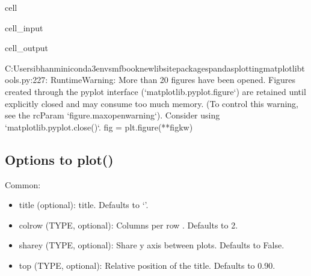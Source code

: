 \documentclass[letterpaper,10pt,english]{jupyterBook}
\begin{document}
\begin{sphinxuseclass}{cell}\begin{sphinxVerbatimInput}

\begin{sphinxuseclass}{cell_input}
\begin{sphinxVerbatim}[commandchars=\\\{\}]

\PYG{p}{[}\PYG{p}{]}
\end{sphinxVerbatim}

\end{sphinxuseclass}\end{sphinxVerbatimInput}
\begin{sphinxVerbatimOutput}

\begin{sphinxuseclass}{cell_output}
\begin{sphinxVerbatim}[commandchars=\\\{\}]
C:\PYGZbs{}Users\PYGZbs{}ibhan\PYGZbs{}miniconda3\PYGZbs{}envs\PYGZbs{}mfbooknew\PYGZbs{}lib\PYGZbs{}site\PYGZhy{}packages\PYGZbs{}pandas\PYGZbs{}plotting\PYGZbs{}\PYGZus{}matplotlib\PYGZbs{}tools.py:227: RuntimeWarning: More than 20 figures have been opened. Figures created through the pyplot interface (`matplotlib.pyplot.figure`) are retained until explicitly closed and may consume too much memory. (To control this warning, see the rcParam `figure.max\PYGZus{}open\PYGZus{}warning`). Consider using `matplotlib.pyplot.close()`.
  fig = plt.figure(**fig\PYGZus{}kw)
\end{sphinxVerbatim}

\end{sphinxuseclass}\end{sphinxVerbatimOutput}

\end{sphinxuseclass}

\subsection{Options to plot()}
\label{\detokenize{content/notebooks/modelflow_features:options-to-plot}}
\sphinxAtStartPar
Common:
\begin{itemize}
\item {} 
\sphinxAtStartPar
title (optional): title. Defaults to ‘’.

\item {} 
\sphinxAtStartPar
colrow (TYPE, optional): Columns per row . Defaults to 2.

\item {} 
\sphinxAtStartPar
sharey (TYPE, optional): Share y axis between plots. Defaults to False.

\item {} 
\sphinxAtStartPar
top (TYPE, optional): Relative position of the title. Defaults to 0.90.

\end{itemize}
\end{document}
